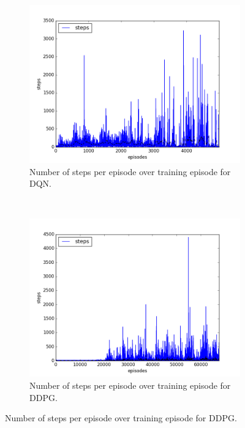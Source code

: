 \begin{figure}[h]
  \centering

  \begin{subfigure}[h]{\figscale\linewidth}
    \includegraphics[trim=10 10 10 10,clip,width=\linewidth]
    {../results/dqn_1vs1/steps.png}
    \caption{Number of steps per episode over training episode for DQN.}
    \label{fig:dqn-1vs1-steps}
  \end{subfigure}
  ~
  \begin{subfigure}[h]{\figscale\linewidth}
    \includegraphics[trim=10 10 10 10,clip,width=\linewidth]
    {../results/ddpg_1vs1/steps.png}
    \caption{Number of steps per episode over training episode for DDPG.}
    \label{fig:ddpg-1vs1-steps}

\end{subfigure}
\end{figure}
